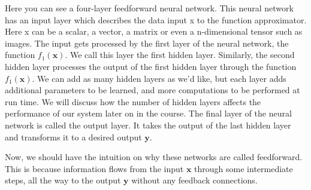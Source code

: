 Here you can see a four-layer feedforward neural network. This neural network has an input layer
which describes the data input x to the function approximator. Here x can be a scalar,
a vector, a matrix or even a n-dimensional tensor such as images. The input gets processed by the first
layer of the neural network, the function $f_1( \mathbf{x})$. We call this layer the first hidden layer. Similarly, the second hidden layer
processes the output of the first hidden layer through the function $f_1( \mathbf{x})$. 
We can add as many hidden layers as we'd like, but each layer adds additional parameters to be learned, and more
computations to be performed at run time. We will discuss how the number of hidden
layers affects the performance of our system later on in the course. The final layer of the neural
network is called the output layer. It takes the output of
the last hidden layer and transforms it to a desired output $\mathbf{y}$. 

Now, we should have the intuition on why these networks are called feedforward. This is because information flows from the
input $\mathbf{x}$ through some intermediate steps, all the way to the output $\mathbf{y}$
without any feedback connections.

